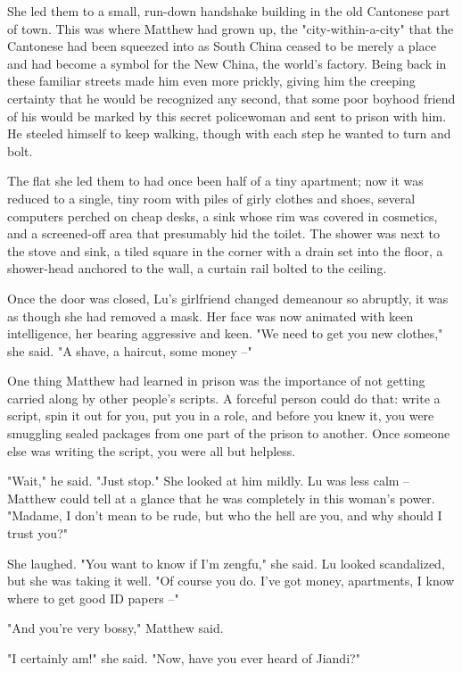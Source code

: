She led them to a small, run-down handshake building in the old
Cantonese part of town. This was where Matthew had grown up, the
"city-within-a-city" that the Cantonese had been squeezed into as
South China ceased to be merely a place and had become a symbol for
the New China, the world's factory. Being back in these familiar
streets made him even more prickly, giving him the creeping
certainty that he would be recognized any second, that some poor
boyhood friend of his would be marked by this secret policewoman
and sent to prison with him. He steeled himself to keep walking,
though with each step he wanted to turn and bolt.

The flat she led them to had once been half of a tiny apartment;
now it was reduced to a single, tiny room with piles of girly
clothes and shoes, several computers perched on cheap desks, a sink
whose rim was covered in cosmetics, and a screened-off area that
presumably hid the toilet. The shower was next to the stove and
sink, a tiled square in the corner with a drain set into the floor,
a shower-head anchored to the wall, a curtain rail bolted to the
ceiling.

Once the door was closed, Lu's girlfriend changed demeanour so
abruptly, it was as though she had removed a mask. Her face was now
animated with keen intelligence, her bearing aggressive and keen.
"We need to get you new clothes," she said. "A shave, a haircut,
some money --"

One thing Matthew had learned in prison was the importance of not
getting carried along by other people's scripts. A forceful person
could do that: write a script, spin it out for you, put you in a
role, and before you knew it, you were smuggling sealed packages
from one part of the prison to another. Once someone else was
writing the script, you were all but helpless.

"Wait," he said. "Just stop." She looked at him mildly. Lu was less
calm -- Matthew could tell at a glance that he was completely in
this woman's power. "Madame, I don't mean to be rude, but who the
hell are you, and why should I trust you?"

She laughed. "You want to know if I'm zengfu," she said. Lu looked
scandalized, but she was taking it well. "Of course you do. I've
got money, apartments, I know where to get good ID papers --"

"And you're very bossy," Matthew said.

"I certainly am!" she said. "Now, have you ever heard of Jiandi?"

